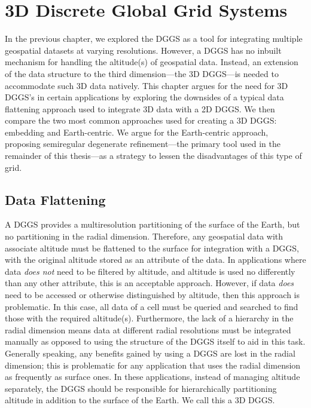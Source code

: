 \chapter{3D Discrete Global Grid Systems} \label{chap:3ddggs}
In the previous chapter, we explored the DGGS as a tool for integrating multiple geospatial datasets at varying resolutions.
However, a DGGS has no inbuilt mechanism for handling the altitude(s) of geospatial data.
Instead, an extension of the data structure to the third dimension---the 3D DGGS---is needed to accommodate such 3D data natively.
This chapter argues for the need for 3D DGGS's in certain applications by exploring the downsides of a typical data flattening approach used to integrate 3D data with a 2D DGGS.
We then compare the two most common approaches used for creating a 3D DGGS: embedding and Earth-centric.
We argue for the Earth-centric approach, proposing semiregular degenerate refinement---the primary tool used in the remainder of this thesis---as a strategy to lessen the disadvantages of this type of grid.


\section{Data Flattening} \label{chap:3:flatten}
A DGGS provides a multiresolution partitioning of the surface of the Earth, but no partitioning in the radial dimension.
Therefore, any geospatial data with associate altitude must be flattened to the surface for integration with a DGGS, with the original altitude stored as an attribute of the data.
In applications where data \textit{does not} need to be filtered by altitude, and altitude is used no differently than any other attribute, this is an acceptable approach.
However, if data \textit{does} need to be accessed or otherwise distinguished by altitude, then this approach is problematic.
In this case, all data of a cell must be queried and searched to find those with the required altitude(s).
Furthermore, the lack of a hierarchy in the radial dimension means data at different radial resolutions must be integrated manually as opposed to using the structure of the DGGS itself to aid in this task.
Generally speaking, any benefits gained by using a DGGS are lost in the radial dimension; this is problematic for any application that uses the radial dimension as frequently as surface ones.
In these applications, instead of managing altitude separately, the DGGS should be responsible for hierarchically partitioning altitude in addition to the surface of the Earth.
We call this a 3D DGGS.


